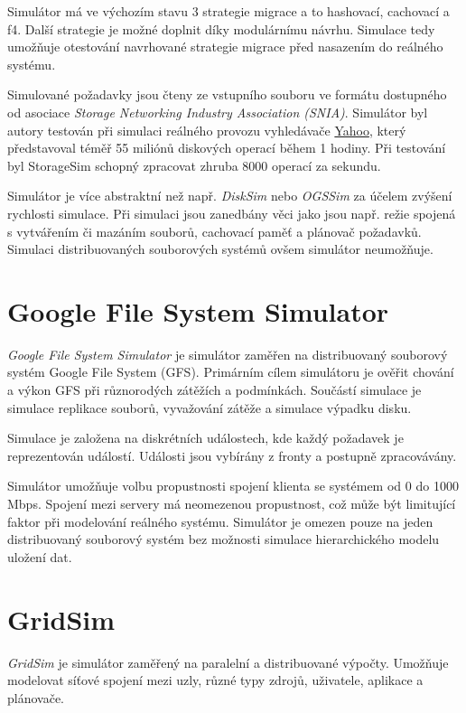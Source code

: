 \documentclass[czech,DP]{thesiskiv}
\begin{document}
Simulátor má ve výchozím stavu 3 strategie migrace a to hashovací, cachovací a f4. Další strategie je možné doplnit díky modulárnímu návrhu. Simulace tedy umožňuje otestování navrhované strategie migrace před nasazením do reálného systému.

Simulované požadavky jsou čteny ze vstupního souboru ve formátu dostupného od asociace \textit{Storage Networking Industry Association (SNIA)}. Simulátor byl autory testován při simulaci reálného provozu vyhledávače \href{https://yahoo.com}{Yahoo}, který představoval téměř 55 miliónů diskových operací během 1 hodiny. Při testování byl StorageSim schopný zpracovat zhruba 8000 operací za sekundu.

Simulátor je více abstraktní než např. \textit{DiskSim} nebo \textit{OGSSim} za účelem zvýšení rychlosti simulace. Při simulaci jsou zanedbány věci jako jsou např. režie spojená s vytvářením či mazáním souborů, cachovací paměť a plánovač požadavků. Simulaci distribuovaných souborových systémů ovšem simulátor neumožňuje.

\section{Google File System Simulator}

\textit{Google File System Simulator} \cite{gfssimulatorpaper} je simulátor zaměřen na distribuovaný souborový systém Google File System (GFS). Primárním cílem simulátoru je ověřit chování a výkon GFS při různorodých zátěžích a podmínkách. Součástí simulace je simulace replikace souborů, vyvažování zátěže a simulace výpadku disku.

Simulace je založena na diskrétních událostech, kde každý požadavek je reprezentován událostí. Události jsou vybírány z fronty a postupně zpracovávány. 

Simulátor umožňuje volbu propustnosti spojení klienta se systémem od 0 do 1000 Mbps. Spojení mezi servery má neomezenou propustnost, což může být limitující faktor při modelování reálného systému. Simulátor je omezen pouze na jeden distribuovaný souborový systém bez možnosti simulace hierarchického modelu uložení dat.

\section{GridSim}

\textit{GridSim} \cite{gridsimpaper} je simulátor zaměřený na paralelní a distribuované výpočty. Umožňuje modelovat síťové spojení mezi uzly, různé typy zdrojů, uživatele, aplikace a plánovače. 
\end{document}
